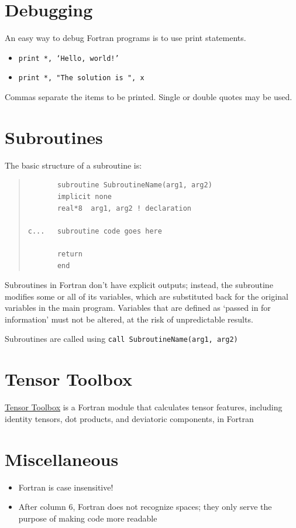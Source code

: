 \documentclass[10pt,letterpaper,oneside]{report}
\begin{document}
\section{Debugging}
An easy way to debug Fortran programs is to use print statements. 
\begin{itemize}
\item \texttt{print *, `Hello, world!'}
\item \texttt{print *, "The solution is ", x}
\end{itemize} 
Commas separate the items to be printed.  Single or double quotes may be used.

\section{Subroutines}
The basic structure of a subroutine is: 

\begin{quote} \begin{lstlisting}
       subroutine SubroutineName(arg1, arg2)
       implicit none
       real*8  arg1, arg2 ! declaration

c...   subroutine code goes here 

       return
       end
\end{lstlisting} \end{quote}

Subroutines in Fortran don't have explicit outputs; instead, the subroutine modifies some or all of its variables, which are substituted back for the original variables in the main program.  Variables that are defined as `passed in for information' must not be altered, at the risk of unpredictable results.

Subroutines are called using \texttt{call SubroutineName(arg1, arg2)}


\section{Tensor Toolbox}
\href{https://github.com/adtzlr/ttb}{Tensor Toolbox} is a Fortran module that calculates tensor features, including identity tensors, dot products, and deviatoric components, in Fortran \autocite{Dutzler}

\section{Miscellaneous}
\begin{itemize}
\item Fortran is case insensitive!  
\item After column 6, Fortran does not recognize spaces; they only serve the purpose of making code more readable
\end{itemize}
\end{document}
